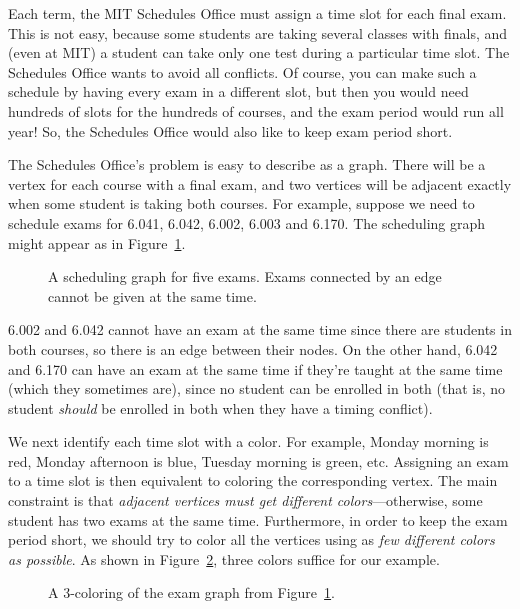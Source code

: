 Each term, the MIT Schedules Office must assign a time slot for each
final exam.  This is not easy, because some students are taking
several classes with finals, and (even at MIT) a student can take only
one test during a particular time slot.  The Schedules Office wants to
avoid all conflicts.  Of course, you can make such a schedule by
having every exam in a different slot, but then you would need
hundreds of slots for the hundreds of courses, and the exam period
would run all year!  So, the Schedules Office would also like to keep
exam period short.

The Schedules Office's problem is easy to describe as a graph.  There
will be a vertex for each course with a final exam, and two vertices
will be adjacent exactly when some student is taking both courses.
For example, suppose we need to schedule exams for 6.041, 6.042,
6.002, 6.003 and 6.170.  The scheduling graph might appear as in
Figure~\ref{fig:5R}.

\begin{figure}


\caption{A scheduling graph for five exams.  Exams connected by an
  edge cannot be given at the same time.}

\label{fig:5R}

\end{figure}

6.002 and 6.042 cannot have an exam at the same time since there are
students in both courses, so there is an edge between their nodes.  On the
other hand, 6.042 and 6.170 can have an exam at the same time if they're
taught at the same time (which they sometimes are), since no student can
be enrolled in both (that is, no student \emph{should} be enrolled in both
when they have a timing conflict).

We next identify each time slot with a color.  For example, Monday
morning is red, Monday afternoon is blue, Tuesday morning is green,
etc.  Assigning an exam to a time slot is then equivalent to coloring
the corresponding vertex.  The main constraint is that \emph{adjacent
  vertices must get different colors}---otherwise, some student has
two exams at the same time.  Furthermore, in order to keep the exam
period short, we should try to color all the vertices using as
\emph{few different colors as possible}.  As shown in Figure~\ref{fig:5S},
three colors suffice for our example.

\begin{figure}


\caption{A 3-coloring of the exam graph from Figure~\ref{fig:5R}.}

\label{fig:5S}

\end{figure}

